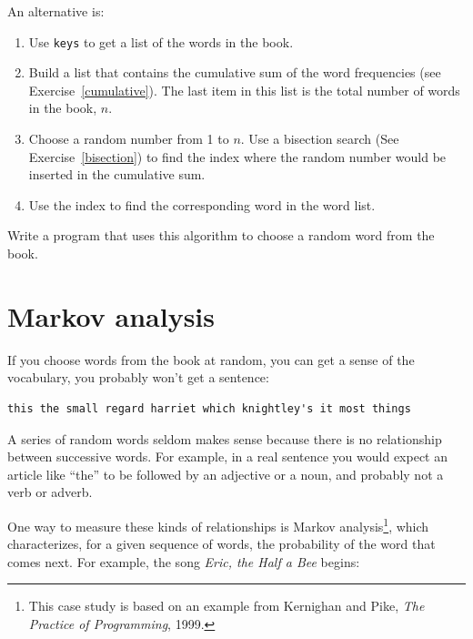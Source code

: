 \documentclass[10pt]{book}
\begin{document}
{\begin{ex}
An alternative is:

\begin{enumerate}

\item Use {\tt keys} to get a list of the words in the book.

\item Build a list that contains the cumulative sum of the word
  frequencies (see Exercise~\ref{cumulative}).  The last item
  in this list is the total number of words in the book, $n$.
  
\item Choose a random number from 1 to $n$.  Use a bisection search
  (See Exercise~\ref{bisection}) to find the index where the random
  number would be inserted in the cumulative sum.

\item Use the index to find the corresponding word in the word list.

\end{enumerate}

Write a program that uses this algorithm to choose a random
word from the book.
\end{ex}



\section{Markov analysis}


If you choose words from the book at random, you can get a
sense of the vocabulary, you probably won't get a sentence:

\beforeverb
\begin{verbatim}
this the small regard harriet which knightley's it most things
\end{verbatim}
\afterverb
%
A series of random words seldom makes sense because there
is no relationship between successive words.  For example, in
a real sentence you would expect an article like ``the'' to
be followed by an adjective or a noun, and probably not a verb
or adverb.

One way to measure these kinds of relationships is Markov
analysis\footnote{This case study is based on an example from
  Kernighan and Pike, {\em The Practice of Programming}, 1999.}, which
characterizes, for a given sequence of words, the probability of the
word that comes next.  For example, the song {\em Eric, the Half a
  Bee} begins:

}
\end{document}
